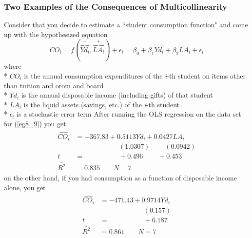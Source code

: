 \documentclass[11pt]{article}
\begin{document}
\subsubsection{Two Examples of the Consequences of Multicollinearity}
Consider that you decide to estimate a ``student consumption function" and come up with the hypothesized equation
\begin{equation}
CO_i = f(\overbrace{Yd_i}^+,\overbrace{LA_i}^+) + \epsilon_i = \beta_0 + \beta_1Yd_i + \beta_2LA_i + \epsilon_i \label{eg8_9}
\end{equation}
where\\*
$CO_i$ is the annual consumption expenditures of the \textit{i}-th student on items other than tuition and orom and board\\*
$Yd_i$ is the annual disposable income (including gifts) of that student\\*
$LA_i$ is the liquid assets (savings, etc.) of the \textit{i}-th student\\*
$\epsilon_i$ is a stochastic error term
After running the OLS regression on the data set for (\ref{eg8_9}) you get 
\begin{align}
\label{eg8_10}
\begin{split}
\widehat{CO_i} &= -367.83 + {0.5113Yd_i} + {0.0427LA_i}\\
&\>\>\>\>\>\>\>\>\>\>\>\>\>\>\>\>\>\>\>\>\>\>\>\>\>\>\>\>\> (1.0307) 
\>\>\>\>\>\>\>\>\>\> (0.0942)\\
t&=\>\>\>\>\>\>\>\>\>\>\>\>\>\>\>\>\>\>\>\>\>\>\> +0.496
\>\>\>\>\>\>\>\>\>\> +0.453\\
\bar{R^2}&= 0.835\quad\quad N=7
\end{split}
\end{align}
on the other hand, if you had consumption as a function of disposable income alone, you get
\begin{align}
\label{eg8_11}
\begin{split}
\widehat{CO_i} &= -471.43 + {0.9714Yd_i}\\
&\>\>\>\>\>\>\>\>\>\>\>\>\>\>\>\>\>\>\>\>\>\>\>\>\>\>\>\>\> (0.157)\\
t&=\>\>\>\>\>\>\>\>\>\>\>\>\>\>\>\>\>\>\>\>\>\>\> +6.187\\
\bar{R^2}&= 0.861\quad\quad N=7
\end{split}
\end{align}
\end{document}
